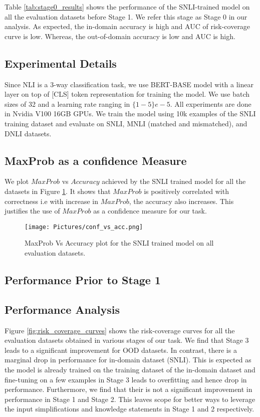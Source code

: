 \documentclass[11pt,a4paper]{article}
\begin{document}
Table \ref{tab:stage0_results} shows the performance of the SNLI-trained model on all the evaluation datasets before Stage 1. We refer this stage as Stage 0 in our analysis.
As expected, the in-domain accuracy is high and AUC of risk-coverage curve is low. Whereas, the out-of-domain accuracy is low and AUC is high.
\subsection{Experimental Details}
Since NLI is a 3-way classification task, we use BERT-BASE model \cite{devlin-etal-2019-bert} with a linear layer on top of [CLS] token representation for training the model.  We use batch sizes of 32 and a learning rate ranging in $\{1{-}5\}e{-}5$. All experiments are done in Nvidia V100 16GB GPUs.
We train the model using 10k examples of the SNLI training dataset and evaluate on SNLI, MNLI (matched and mismatched), and DNLI datasets. 

\subsection{MaxProb as a confidence Measure}
We plot $MaxProb$ vs $Accuracy$ achieved by the SNLI trained model for all the datasets in Figure \ref{fig:conf_vs_acc}.
It shows that $MaxProb$ is positively correlated with correctness i.e with increase in $MaxProb$, the accuracy also increases. 
This justifies the use of $MaxProb$ as a confidence measure for our task.

\begin{figure}[t]
    \centering
    \texttt{[image: Pictures/conf\_vs\_acc.png]}
    \caption{MaxProb Vs Accuracy plot for the SNLI trained model on all evaluation datasets.}
    \label{fig:conf_vs_acc}
\end{figure}


\subsection{Performance Prior to Stage 1}



\subsection{Performance Analysis}
Figure \ref{fig:risk_coverage_curves} shows the risk-coverage curves for all the evaluation datasets obtained in various stages of our task.
We find that Stage 3 leads to a significant improvement for OOD datasets.
In contrast, there is a marginal drop in performance for in-domain dataset (SNLI). 
This is expected as the model is already trained on the training dataset of the in-domain dataset and fine-tuning on a few examples in Stage 3 leads to overfitting and hence drop in performance. 
Furthermore, we find that their is not a significant improvement in performance in Stage 1 and Stage 2. This leaves scope for better ways to leverage the input simplifications and knowledge statements in Stage 1 and 2 respectively.
\end{document}
